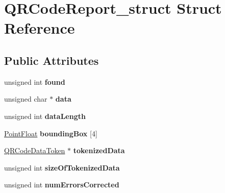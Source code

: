 \hypertarget{structQRCodeReport__struct}{
\section{QRCodeReport\_\-struct Struct Reference}
\label{structQRCodeReport__struct}
}
\subsection*{Public Attributes}
\begin{DoxyCompactItemize}
\item 
\hypertarget{structQRCodeReport__struct_ab9ace5e492dac9b2bf9e55b048d62379}{
unsigned int {\bfseries found}}
\label{structQRCodeReport__struct_ab9ace5e492dac9b2bf9e55b048d62379}

\item 
\hypertarget{structQRCodeReport__struct_a12a32970ffb146f6823a39318cff241e}{
unsigned char $\ast$ {\bfseries data}}
\label{structQRCodeReport__struct_a12a32970ffb146f6823a39318cff241e}

\item 
\hypertarget{structQRCodeReport__struct_a96132bed6a41917df7d32dd03a103886}{
unsigned int {\bfseries dataLength}}
\label{structQRCodeReport__struct_a96132bed6a41917df7d32dd03a103886}

\item 
\hypertarget{structQRCodeReport__struct_a4744c1356ae8754a755b42fccbcf7c8e}{
\hyperlink{structPointFloat__struct}{PointFloat} {\bfseries boundingBox} \mbox{[}4\mbox{]}}
\label{structQRCodeReport__struct_a4744c1356ae8754a755b42fccbcf7c8e}

\item 
\hypertarget{structQRCodeReport__struct_a13ef390c35497f32f62226ebd463ced0}{
\hyperlink{structQRCodeDataToken__struct}{QRCodeDataToken} $\ast$ {\bfseries tokenizedData}}
\label{structQRCodeReport__struct_a13ef390c35497f32f62226ebd463ced0}

\item 
\hypertarget{structQRCodeReport__struct_ab0cfcb9cbe81d0a0a2a4cc693891d8ef}{
unsigned int {\bfseries sizeOfTokenizedData}}
\label{structQRCodeReport__struct_ab0cfcb9cbe81d0a0a2a4cc693891d8ef}

\item 
\hypertarget{structQRCodeReport__struct_a9fba01d0581a20584c914cbd0973e0bd}{
unsigned int {\bfseries numErrorsCorrected}}
\label{structQRCodeReport__struct_a9fba01d0581a20584c914cbd0973e0bd}


\end{DoxyCompactItemize}
